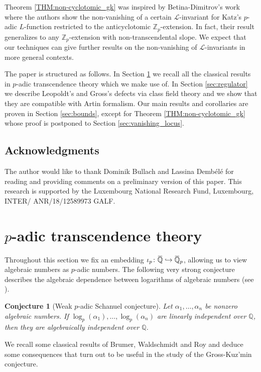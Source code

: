 \documentclass[12pt]{amsart}
\newcommand\bQ{\mathbb{Q}}
\newcommand\Zp{{\mathbb{Z}_p}}
\newcommand\cL{\mathcal{L}}
\newcommand{\ob}[1]{\mkern 1.5mu\overline{\mkern-1.5mu#1\mkern-1.5mu}\mkern 1.5mu}
\theoremstyle{defstyle}
\theoremstyle{thmstyle}
\newtheorem*{conjecture*}{Conjecture}
\begin{document}
	Theorem \ref{THM:non-cyclotomic_gk} was inspired by Betina-Dimitrov's work \cite{betinadimitrovKatz} where the authors show the non-vanishing of a certain $\cL$-invariant for Katz's $p$-adic $L$-function restricted to the anticyclotomic $\Zp$-extension. In fact, their result generalizes to any $\Zp$-extension with non-transcendental slope. We expect that our techniques can give further results on the non-vanishing of $\cL$-invariants in more general contexts. 
	
	The paper is structured as follows. In Section \ref{sec:transcendence} we recall all the classical results in $p$-adic transcendence theory which we make use of. In Section \ref{sec:regulator} we describe Leopoldt's and Gross's defects via class field theory and we show that they are compatible with Artin formalism. Our main results and corollaries are proven in Section \ref{sec:bounds}, except for Theorem \ref{THM:non-cyclotomic_gk} whose proof is postponed to Section \ref{sec:vanishing_locus}.
	
	\subsection*{Acknowledgments}
	The author would like to thank Dominik Bullach and Lassina Demb\'el\'e for reading and providing comments on a preliminary version of this paper. This research is supported by the Luxembourg National Research Fund, Luxembourg, INTER/
	ANR/18/12589973 GALF.
	
	
	\section{$p$-adic transcendence theory}\label{sec:transcendence}
	Throughout this section we fix an embedding $\iota_p \colon \ob{\bQ}\hookrightarrow\ob{\bQ}_p$, allowing us to view algebraic numbers as $p$-adic numbers. The following very strong conjecture describes the algebraic dependence between logarithms of algebraic numbers (see \cite[Conjecture 3.10]{mazurcalegari}).
	
	\begin{conjecture*}[Weak $p$-adic Schanuel conjecture]
		Let $\alpha_1,\ldots,\alpha_n$ be nonzero algebraic numbers. If $\log_p(\alpha_1),\ldots,\log_p(\alpha_n)$ are linearly independent over $\bQ$, then they are algebraically independent over ${\bQ}$. 
	\end{conjecture*}
	
	We recall some classical results of Brumer, Waldschmidt and Roy and deduce some consequences that turn out to be useful in the study of the Gross-Kuz'min conjecture.
\end{document}
